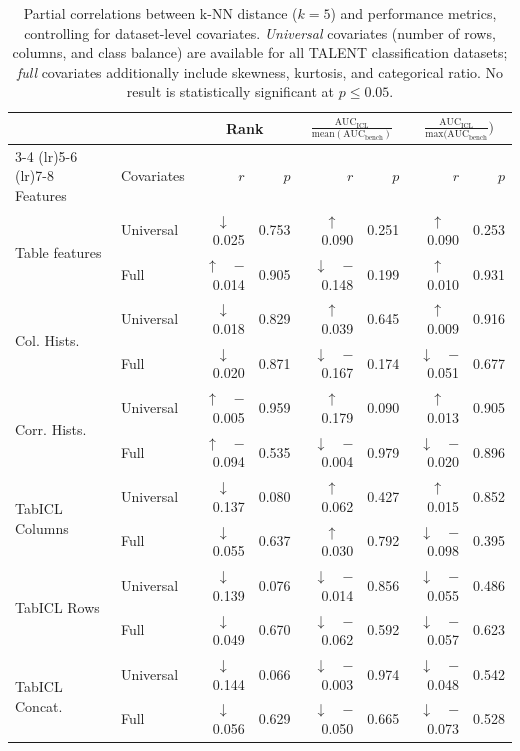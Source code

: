 \documentclass{article}
\begin{document}
\begin{table}[ht]
\centering
\caption{Partial correlations between k-NN distance ($k=5$) and performance metrics, controlling for dataset-level covariates. \emph{Universal} covariates (number of rows, columns, and class balance) are available for all TALENT classification datasets; \emph{full} covariates additionally include skewness, kurtosis, and categorical ratio. No result is statistically significant at $p \leq 0.05$.}
\label{tab:partial_corr}
\begin{tabular}{ll rr rr rr}
\toprule
 & & \multicolumn{2}{c}{Rank} & \multicolumn{2}{c}{$\frac{\textrm{AUC}_{\textrm{ICL}}}{\textrm{mean}(\textrm{AUC}_{\textrm{bench}})}$} & \multicolumn{2}{c}{$\frac{\textrm{AUC}_{\textrm{ICL}}}{\textrm{max}(\textrm{AUC}_{\textrm{bench}}})$} \\
\cmidrule(lr){3-4} \cmidrule(lr){5-6} \cmidrule(lr){7-8}
Features & Covariates & $r$ & $p$ & $r$ & $p$ & $r$ & $p$ \\
\midrule
\multirow{2}{*}{Table features}
 & Universal & {$\downarrow \quad$ 0.025} & 0.753 & {$\uparrow \quad$ 0.090} & 0.251 & {$\uparrow \quad$ 0.090} & 0.253 \\
 & Full      & {$\uparrow \quad$$-$0.014} & 0.905 & {$\downarrow \quad$$-$0.148} & 0.199 & {$\uparrow \quad$ 0.010} & 0.931 \\
\multirow{2}{*}{Col. Hists.}
 & Universal & {$\downarrow \quad$ 0.018} & 0.829 & {$\uparrow \quad$ 0.039} & 0.645 & {$\uparrow \quad$ 0.009} & 0.916 \\
 & Full      & {$\downarrow \quad$ 0.020} & 0.871 & {$\downarrow \quad$$-$0.167} & 0.174 & {$\downarrow \quad$$-$0.051} & 0.677 \\
\multirow{2}{*}{Corr. Hists.}
 & Universal & {$\uparrow \quad$$-$0.005} & 0.959 & {$\uparrow \quad$ 0.179} & 0.090 & {$\uparrow \quad$ 0.013} & 0.905 \\
 & Full      & {$\uparrow \quad$$-$0.094} & 0.535 & {$\downarrow \quad$$-$0.004} & 0.979 & {$\downarrow \quad$$-$0.020} & 0.896 \\
\midrule
\multirow{2}{*}{TabICL Columns}
 & Universal & {$\downarrow \quad$ 0.137} & 0.080 & {$\uparrow \quad$ 0.062} & 0.427 & {$\uparrow \quad$ 0.015} & 0.852 \\
 & Full      & {$\downarrow \quad$ 0.055} & 0.637 & {$\uparrow \quad$ 0.030} & 0.792 & {$\downarrow \quad$$-$0.098} & 0.395 \\
\multirow{2}{*}{TabICL Rows}
 & Universal & {$\downarrow \quad$ 0.139} & 0.076 & {$\downarrow \quad$$-$0.014} & 0.856 & {$\downarrow \quad$$-$0.055} & 0.486 \\
 & Full      & {$\downarrow \quad$ 0.049} & 0.670 & {$\downarrow \quad$$-$0.062} & 0.592 & {$\downarrow \quad$$-$0.057} & 0.623 \\
\multirow{2}{*}{TabICL Concat.}
 & Universal & {$\downarrow \quad$ 0.144} & 0.066 & {$\downarrow \quad$$-$0.003} & 0.974 & {$\downarrow \quad$$-$0.048} & 0.542 \\
 & Full      & {$\downarrow \quad$ 0.056} & 0.629 & {$\downarrow \quad$$-$0.050} & 0.665 & {$\downarrow \quad$$-$0.073} & 0.528 \\
\bottomrule
\end{tabular}
\end{table}
\end{document}
